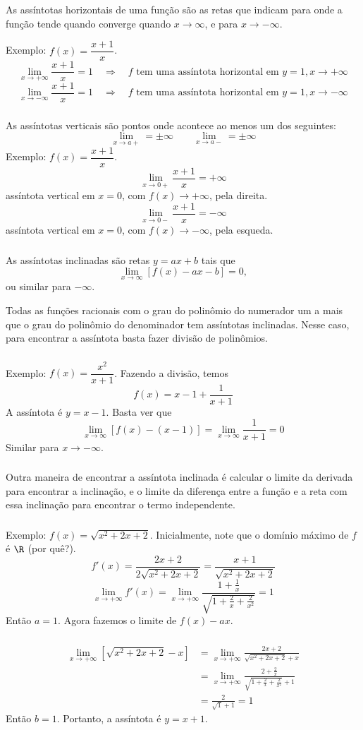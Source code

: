 \documentclass[10 pt]{beamer}
\newcommand{\myframe}[1]{
\begin{frame}
 \frametitle{\insertsection \qquad {\small \insertsubsection}}
#1
\end{frame}}
\newcommand{\limx}[1]{\lim_{x\rightarrow{#1}}}
\begin{document}
\myframe {
  As assíntotas horizontais de uma função são as retas que indicam
  para onde a função tende quando converge quando $x\rightarrow\infty$,
  e para $x\rightarrow-\infty$.

  Exemplo: $f(x) = \dfrac{x+1}{x}$.
  $$ \limx{+\infty}\frac{x+1}{x} = 1 \quad
      \Longrightarrow \quad \mbox{$f$ tem uma assíntota horizontal em } 
        y=1, x\rightarrow+\infty$$
  $$ \limx{-\infty}\frac{x+1}{x} = 1 \quad
      \Longrightarrow \quad \mbox{$f$ tem uma assíntota horizontal em } 
        y=1, x\rightarrow-\infty$$
}

\myframe {
  As assíntotas verticais são pontos onde acontece ao menos um dos seguintes:
  $$ \limx{a+} = \pm\infty \qquad \limx{a-} = \pm\infty $$
  Exemplo: $f(x) = \dfrac{x+1}{x}$.
  $$ \limx{0+}\frac{x+1}{x} = +\infty $$
    assíntota vertical em $x = 0$, com $f(x)\rightarrow+\infty$, pela direita.
  $$ \limx{0-}\frac{x+1}{x} = -\infty $$
    assíntota vertical em $x = 0$, com $f(x)\rightarrow-\infty$, pela esqueda.
}

\myframe {
  As assíntotas inclinadas são retas $y = ax+b$ tais que
  $$ \limx{\infty}[f(x) - ax-b] = 0, $$
  ou similar para $-\infty$.

  Todas as funções racionais com o grau do polinômio do numerador um a mais
  que o grau do polinômio do denominador tem assíntotas inclinadas.
  Nesse caso, para encontrar a assíntota basta fazer divisão de polinômios.
}

\myframe {
  Exemplo: $f(x) = \dfrac{x^2}{x+1}$. Fazendo a divisão, temos
  $$ f(x) = x-1 + \frac{1}{x+1} $$
  A assíntota é $y = x-1$. Basta ver que
  $$ \limx{\infty}[f(x)-(x-1)] = \limx{\infty}\frac{1}{x+1} = 0 $$
  Similar para $x \rightarrow-\infty$.
}

\myframe {
  Outra maneira de encontrar a assíntota inclinada é calcular o limite
  da derivada para encontrar a inclinação, e o limite da diferença
  entre a função e a reta com essa inclinação para encontrar o termo
  independente.
}

\myframe {
  Exemplo: $f(x) = \sqrt{x^2 + 2x + 2}$. Inicialmente, note que o domínio
  máximo de $f$ é $\R$ (por quê?).
  $$ f'(x) = \frac{2x + 2}{2\sqrt{x^2 + 2x + 2}} = \frac{x+1}{\sqrt{x^2+2x+2}} $$
  $$ \limx{+\infty}f'(x) = 
    \limx{+\infty}\frac{1+\frac{1}{x}}{\sqrt{1+\frac{2}{x}+\frac{2}{x^2}}} = 1$$
  Então $a = 1$. Agora fazemos o limite de $f(x) - ax$.
}

\myframe {
  \begin{align*}
    \limx{+\infty} [\sqrt{x^2+2x+2} - x] 
      & = \limx{+\infty} \frac{2x+2}{\sqrt{x^2+2x+2}+x} \\
      & = \limx{+\infty} \frac{2+\frac{2}{x}} 
          {\sqrt{1 + \frac{2}{x} + \frac{2}{x^2}} + 1} \\
      & = \frac{2}{\sqrt{1}+1} = 1
  \end{align*}
  Então $b = 1$. Portanto, a assíntota é $y = x + 1$.
}
\end{document}

